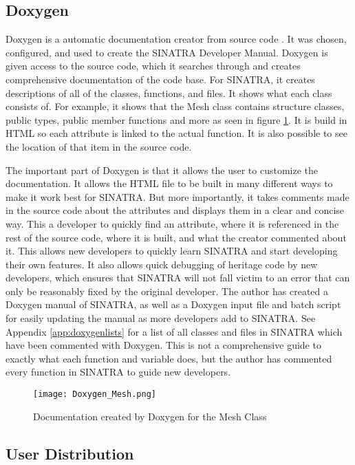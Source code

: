 \subsection{Doxygen}
Doxygen is a automatic documentation creator from source code \cite{doxygen}. It was chosen, configured, and used to create the SINATRA Developer Manual. Doxygen is given access to the source code, which it searches through and creates comprehensive documentation of the code base. For SINATRA, it creates descriptions of all of the classes, functions, and files. It shows what each class consists of. For example, it shows that the Mesh class contains structure classes, public types, public member functions and more as seen in figure \ref{fig:Doxygen_Mesh}. It is build in HTML so each attribute is linked to the actual function. It is also possible to see the location of that item in the source code. \par
\indent The important part of Doxygen is that it allows the user to customize the documentation. It allows the HTML file to be built in many different ways to make it work best for SINATRA. But more importantly, it takes comments made in the source code about the attributes and displays them in a clear and concise way. This a developer to quickly find an attribute, where it is referenced in the rest of the source code, where it is built, and what the creator commented about it. This allows new developers to quickly learn SINATRA and start developing their own features. It also allows quick debugging of heritage code by new developers, which ensures that SINATRA will not fall victim to an error that can only be reasonably fixed by the original developer. The author has created a Doxygen manual of SINATRA, as well as a Doxygen input file and batch script for easily updating the manual as more developers add to SINATRA. See Appendix \ref{app:doxygenlists} for a list of all classes and files in SINATRA which have been commented with Doxygen. This is not a comprehensive guide to exactly what each function and variable does, but the author has commented every function in SINATRA to guide new developers. 


\begin{figure}
\texttt{[image: Doxygen\_Mesh.png]}
\centering
\caption{Documentation created by Doxygen for the Mesh Class}
\label{fig:Doxygen_Mesh}
\end{figure}


\subsection{User Distribution}
% 
